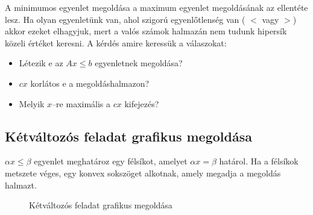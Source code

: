 A minimumos egyenlet megoldása a maximum egyenlet megoldásának az ellentéte
lesz. Ha olyan egyenletünk van, ahol szigorú egyenlőtlenség van ( $<$ vagy $>$)
akkor ezeket elhagyjuk, mert a valós számok halmazán nem tudunk hipersík közeli
értéket keresni. A kérdés amire keressük a válaszokat:

\begin{itemize}
	\item Létezik e az $Ax \leq b$ egyenletnek megoldása?
	\item $cx$ korlátos e a megoldáshalmazon?
	\item Melyik $x$--re maximális a $cx$ kifejezés?
\end{itemize}

\subsection{Kétváltozós feladat grafikus megoldása}

$\alpha x \leq \beta$ egyenlet meghatároz egy félsíkot, amelyet $\alpha x = \beta$
határol. Ha a félsíkok metszete véges, egy konvex sokszöget alkotnak, amely megadja a
megoldás halmazt.

\begin{figure}[htbp]
	\centering
	\caption{Kétváltozós feladat grafikus megoldása} \label{fig:KetValtGraf}
\end{figure}

